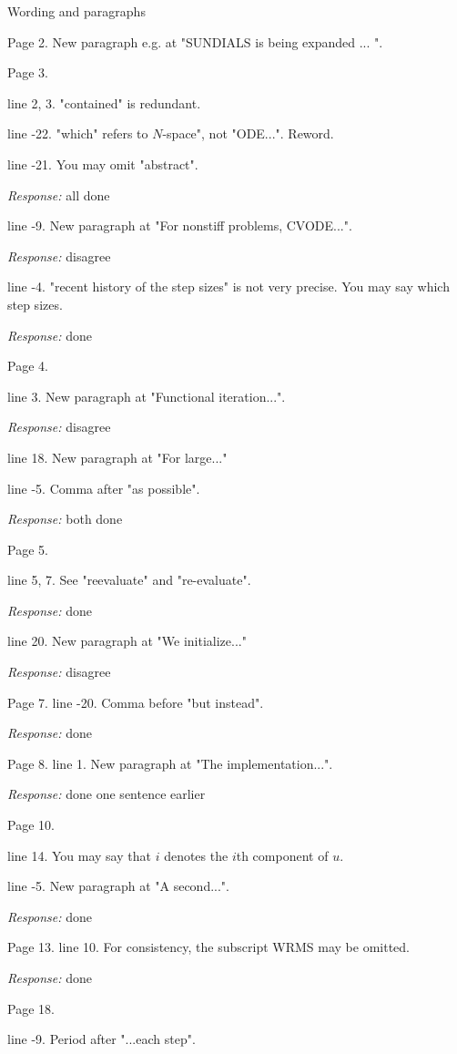 Wording and paragraphs
 
Page 2. New paragraph e.g. at "SUNDIALS is being expanded ... ". 
 
Page 3.  

line 2, 3. "contained" is redundant.  

line -22. "which" refers to $N$-space", not "ODE...". Reword.  

line -21. You may omit "abstract".  

{\em Response:} all done

line -9. New paragraph at "For nonstiff problems, CVODE...".  

{\em Response:} disagree

line -4. "recent history of the step sizes" is not very precise. You
may say which step sizes.

{\em Response:} done

Page 4.

line 3. New paragraph at "Functional iteration...".  

{\em Response:} disagree

line 18. New paragraph at "For large..."  

line -5. Comma after "as possible". 

{\em Response:} both done
 
Page 5.

line 5, 7. See "reevaluate" and "re-evaluate".  

{\em Response:} done

line 20. New paragraph at "We initialize..."  

{\em Response:} disagree

Page 7.
line -20. Comma before "but instead". 

{\em Response:} done

Page 8.  
line 1. New paragraph at "The implementation...". 

{\em Response:} done one sentence earlier
 
Page 10.

line 14. You may say that $i$ denotes the $i$th component of $u$.  

line -5. New paragraph at "A second...".  

{\em Response:} done

Page 13.  
line 10. For consistency, the subscript WRMS may be omitted. 

{\em Response:} done
 
Page 18.

line -9. Period after "...each step".  

